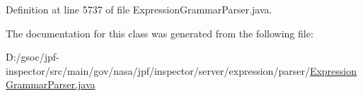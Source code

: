 Definition at line 5737 of file Expression\+Grammar\+Parser.\+java.



The documentation for this class was generated from the following file\+:\begin{DoxyCompactItemize}
\item 
D\+:/gsoc/jpf-\/inspector/src/main/gov/nasa/jpf/inspector/server/expression/parser/\hyperlink{_expression_grammar_parser_8java}{Expression\+Grammar\+Parser.\+java}\end{DoxyCompactItemize}
